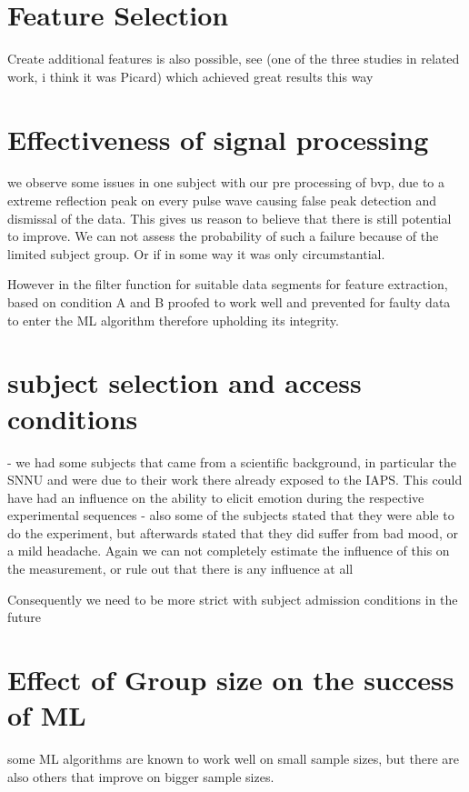 \section{Feature Selection}
Create additional features is also possible, see (one of the three studies in related work, i think it was Picard) which achieved great results this way



\section{Effectiveness of signal processing}
we observe some issues in one subject with our pre processing of bvp, due to a extreme reflection peak on every pulse wave causing false peak detection and dismissal of the data. This gives us reason to believe that there is still potential to improve. We can not assess the probability of such a failure because of the limited subject group. Or if in some way it was only circumstantial.

However in the filter function for suitable data segments for feature extraction, based on condition A and B proofed to work well and prevented for faulty data to enter the ML algorithm therefore upholding its integrity.

\section{subject selection and access conditions}
- we had some subjects that came from a scientific background, in particular the SNNU and were due to their work there already exposed to the IAPS. This could have had an influence on the ability to elicit emotion during the respective experimental sequences 
- also some of the subjects stated that they were able to do the experiment, but afterwards stated that they did suffer from bad mood, or a mild headache. Again we can not completely estimate the influence of this on the measurement, or rule out that there is any influence at all

Consequently we need to be more strict with subject admission conditions in the future

\section{Effect of Group size on the success of ML}
some ML algorithms are known to work well on small sample sizes, but there are also others that improve on bigger sample sizes.

